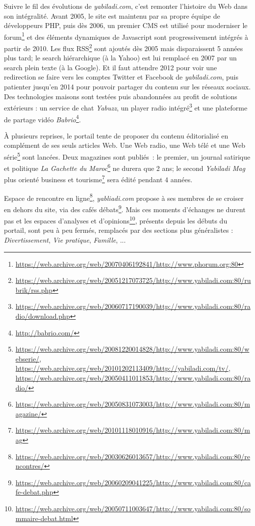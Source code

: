 \documentclass[symmetric,justified,marginals=raggedouter]{tufte-book}
\begin{document}
Suivre le fil des évolutions de \textit{yabiladi.com}, c'est remonter l'histoire du Web dans son intégralité. Avant 2005, le site est maintenu par sa propre équipe de développeurs PHP, puis dès 2006, un premier CMS est utilisé pour moderniser le forum\footnote{\url{https://web.archive.org/web/20070406192841/http://www.phorum.org:80}} et des éléments dynamiques de Javascript sont progressivement intégrés à partir de 2010. Les flux RSS\footnote{\url{https://web.archive.org/web/20051217073725/http://www.yabiladi.com:80/rubrik/rss.php}} sont ajoutés dès 2005 mais disparaissent 5 années plus tard; le search hiérarchique (à la Yahoo) est lui remplacé en 2007 par un search plein texte (à la Google). Et il faut attendre 2012 pour voir une redirection se faire vers les comptes Twitter et Facebook de \textit{yabiladi.com}, puis patienter jusqu'en 2014 pour pouvoir partager du contenu sur les réseaux sociaux. Des technologies maisons sont testées puis abandonnées au profit de solutions extérieurs : un service de chat \textit{Yabuzz}, un player radio intégré\footnote{\url{https://web.archive.org/web/20060717190039/http://www.yabiladi.com:80/radio/download.php}} et une plateforme de partage vidéo \textit{Babrio}\footnote{\url{http://babrio.com/}}.

À plusieurs reprises, le portail tente de proposer du contenu éditorialisé en complément de ses seuls articles Web. Une Web radio, une Web télé et une Web série\footnote{\url{https://web.archive.org/web/20081220014828/http://www.yabiladi.com:80/webserie/}, \url{https://web.archive.org/web/20101202113409/http://yabiladi.com/tv/}, \url{https://web.archive.org/web/20050411011853/http://www.yabiladi.com:80/radio/}} sont lancées. Deux magazines sont publiés~: le premier, un journal satirique et politique \textit{La Gachette du Maroc}\footnote{\url{https://web.archive.org/web/20050831073003/http://www.yabiladi.com:80/magazine/}} ne durera que 2 ans; le second \textit{Yabiladi Mag} plus orienté business et tourisme\footnote{\url{https://web.archive.org/web/20101118010916/http://www.yabiladi.com:80/mag}} sera édité pendant 4 années. 

Espace de rencontre en ligne\footnote{\url{https://web.archive.org/web/20030626013657/http://www.yabiladi.com:80/rencontres/}}, \textit{yabliadi.com} propose à ses membres de se croiser en dehors du site, via des cafés débats\footnote{\url{https://web.archive.org/web/20060209041225/http://www.yabiladi.com:80/cafe-debat.php}}. Mais ces moments d'échanges ne durent pas et les espaces d'analyses et d'opinions\footnote{\url{https://web.archive.org/web/20050711003647/http://www.yabiladi.com:80/sommaire-debat.html}}, présents depuis les débuts du portail, sont peu à peu fermés, remplacés par des sections plus généralistes : \textit{Divertissement}, \textit{Vie pratique}, \textit{Famille}, ... 
\end{document}
